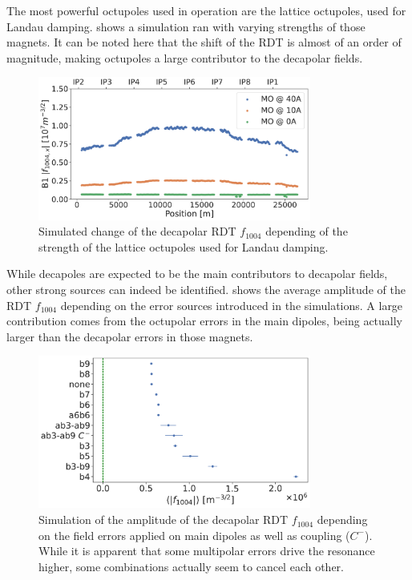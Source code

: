 The most powerful octupoles used in operation are the lattice octupoles, used for Landau damping.
 shows a simulation ran with varying strengths of
those magnets. It can be noted here that the shift of the RDT is almost of an order of magnitude,
making octupoles a large contributor to the decapolar fields.

\begin{figure}[!htb]
    \centering
    \includegraphics[width=0.8\textwidth]{./images/f1004/f1004_mo.pdf}
    \caption{Simulated change of the decapolar RDT $f_{1004}$ depending of the strength of the
    lattice octupoles used for Landau damping.}
    \label{fig:decapoles:rdts:simulation_mo_powered}
\end{figure}

While decapoles are expected to be the main contributors to decapolar fields, other strong sources
can indeed be identified.  shows the average amplitude of the
RDT $f_{1004}$ depending on the error sources introduced in the simulations. A large contribution
comes from the octupolar errors in the main dipoles, being actually larger than the decapolar errors
in those magnets.

\begin{figure}[!htb]
    \centering
    \includegraphics[width=0.8\textwidth]{./images/f1004/f1004_several_factors.pdf}
    \caption{Simulation of the amplitude of the decapolar RDT $f_{1004}$ depending on the field
             errors applied on main dipoles as well as coupling ($C^-$). While it is apparent that
             some multipolar errors drive the resonance higher, some combinations actually seem to
             cancel each other.}
    \label{fig:decapoles:rdts:contributions}
\end{figure}

